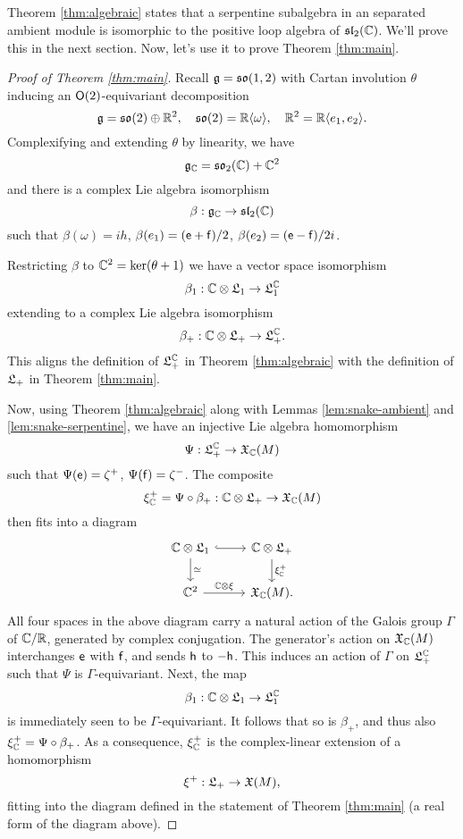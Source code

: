 \subsection{}
Theorem \ref{thm:algebraic} states that a serpentine subalgebra in an separated
ambient module is isomorphic to the positive loop algebra of $\mathfrak{sl}_2({\mathbb{C}})$.
We'll prove this in the next section. Now, let's use it to prove
Theorem \ref{thm:main}.

\begin{proof}[Proof of Theorem \ref{thm:main}]
Recall $\mathfrak{g} = \mathfrak{so}(1,2)$ with Cartan involution $\theta$ inducing an $\mathsf{O}(2)$-equivariant
decomposition
\[
        \mathfrak{g} = \mathfrak{so}(2) \oplus {\mathbb{R}}^2,\quad     \mathfrak{so}(2) = {\mathbb{R}}\langle\omega\rangle,\quad  {\mathbb{R}}^2 = {\mathbb{R}}\langle e_1,e_2\rangle.
\]
Complexifying and extending $\theta$ by linearity, we have
\[
        \mathfrak{g}_{{\mathbb{C}}} = \mathfrak{so}_2({\mathbb{C}}) + {\mathbb{C}}{}^2
\]
and there is a complex Lie algebra isomorphism
\[
        \beta : \mathfrak{g}_{{\mathbb{C}}} \to \mathfrak{sl}_2({\mathbb{C}})
\]
such that $\beta(\omega)=ih$, $\beta(e_1)=(\mathsf{e}+\mathsf{f})/2$, $\beta(e_2)=(\mathsf{e}-\mathsf{f})/2i$.

Restricting $\beta$ to ${\mathbb{C}}^2=\ker(\theta+1)$ we have a vector space isomorphism
\[
        \beta_1 : {\mathbb{C}}\otimes\mathfrak{L}_1 \to \mathfrak{L}_1^{{\mathbb{C}}}
\]
extending to a complex Lie algebra isomorphism
\[
        \beta_+ : {\mathbb{C}}\otimes\mathfrak{L}_+ \to \mathfrak{L}_+^{{\mathbb{C}}}.
\]
This aligns the definition of $\mathfrak{L}_+^{{\mathbb{C}}}$ in Theorem \ref{thm:algebraic} with the
definition of $\mathfrak{L}_+$ in Theorem \ref{thm:main}.

Now, using Theorem \ref{thm:algebraic} along with Lemmas \ref{lem:snake-ambient} and \ref{lem:snake-serpentine}, we have an injective Lie algebra
homomorphism
\[
        \Psi:\mathfrak{L}_+^{{\mathbb{C}}} \to \mathfrak{X}_{{\mathbb{C}}}(M)
\]
such that $\Psi(\mathsf{e})=\zeta^+$, $\Psi(\mathsf{f})=\zeta^-$. The composite
\[
        \xi^+_{{\mathbb{C}}} = \Psi\circ\beta_+ : {\mathbb{C}}\otimes\mathfrak{L}_+\to\mathfrak{X}_{{\mathbb{C}}}(M)
\]     
then fits into a diagram
\[\begin{tikzcd}
        \CC\otimes\L_1 \arrow[d,"\simeq"] \arrow[r,hookrightarrow] & \CC\otimes\L_+ \arrow[d,"\xi^+_{\CC}"] \\
        \CC^2 \arrow[r,"\CC\otimes\xi"] & \XC(\Mr).
\end{tikzcd}\]
All four spaces in the above diagram carry a natural action of the
Galois group $\Gamma$ of ${\mathbb{C}}/{\mathbb{R}}$, generated by complex conjugation. The generator's
action on $\mathfrak{X}_{{\mathbb{C}}}(M)$ interchanges $\mathsf{e}$ with $\mathsf{f}$, and sends $\mathsf{h}$ to $-\mathsf{h}$. This induces 
an action of $\Gamma$ on $\mathfrak{L}_+^{{\mathbb{C}}}$ such that $\Psi$ is $\Gamma$-equivariant. Next, the map
\[
        \beta_1 : {\mathbb{C}}\otimes\mathfrak{L}_1 \to \mathfrak{L}_1^{{\mathbb{C}}}
\]
is immediately seen to be $\Gamma$-equivariant. It follows that so is $\beta_+$,
and thus also $\xi^+_{{\mathbb{C}}} = \Psi \circ \beta_+$. As a consequence, $\xi^+_{{\mathbb{C}}}$ is the complex-linear
extension of a homomorphism
\[
        \xi^+ : \mathfrak{L}_+ \to \mathfrak{X}(M),
\]
fitting into the diagram defined in the statement of Theorem \ref{thm:main} (a
real form of the diagram above).
\end{proof}


